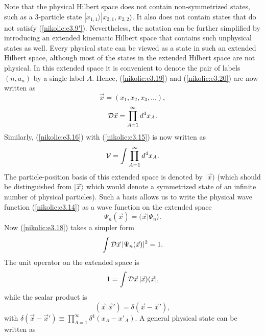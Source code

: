 \documentclass[12pt,twoside]{report} %
\begin{document}
Note that the physical Hilbert space does not contain non-symmetrized
states, such as a 3-particle state $|x_{1,1}\rangle |x_{2,1},x_{2,2}\rangle$.
It also does not contain states that do not satisfy (\ref{nikolic:e3.9'}). 
Nevertheless, the notation can be further simplified by introducing an extended
kinematic Hilbert space that contains such unphysical states as well.
Every physical state can be viewed as a state in such an extended Hilbert space,
although most of the states in the extended Hilbert space are not physical.
In this extended space it is convenient to denote the pair of
labels $(n,a_n)$ by a single label $A$. Hence,  (\ref{nikolic:e3.19}) and (\ref{nikolic:e3.20})
are now written as
\begin{equation}\label{nikolic:e3.21}
 \vec{x}=(x_1,x_2,x_3,\ldots ),
\end{equation}
\begin{equation}\label{nikolic:e3.22}
 {\cal D}\vec{x} = \prod_{A=1}^{\infty} d^4x_A .
\end{equation}
Similarly, (\ref{nikolic:e3.16}) with (\ref{nikolic:e3.15}) is now written as
\begin{equation}\label{nikolic:e3.23}
 {\cal V}=\int \prod_{A=1}^{\infty} d^4x_A .
\end{equation}
The particle-position basis of this extended space is denoted by $|\vec{x})$ (which should be
distinguished from $|\vec{x}\rangle$ which would denote a symmetrized state
of an infinite number of physical particles).  
Such a basis allows us to write  
the physical wave function (\ref{nikolic:e3.14}) as a wave function 
on the extended space 
\begin{equation}\label{nikolic:e3.25}
 \Psi_n(\vec{x})=(\vec{x}|\Psi_n\rangle .
\end{equation}
Now (\ref{nikolic:e3.18}) takes a simpler form 
\begin{equation}\label{nikolic:e3.18'}
\int {\cal D}\vec{x} \, | \Psi_n(\vec{x})|^2 =1 .
\end{equation}
The unit operator on the extended space is
\begin{equation}\label{nikolic:e3.24}
 1=\int {\cal D}\vec{x} \, |\vec{x}) (\vec{x}| ,
\end{equation}
while the scalar product is
\begin{equation}\label{nikolic:e3.24'}
 (\vec{x}|\vec{x}')=\delta(\vec{x}-\vec{x}') ,
\end{equation}
with $\delta(\vec{x}-\vec{x}') \equiv \prod_{A=1}^{\infty}\delta^4(x_A-x'_A)$.
A general physical state can be written as
\end{document}
